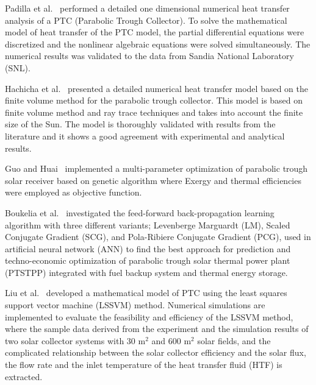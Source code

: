 Padilla et al.~\cite{Padilla2011} performed a detailed one dimensional numerical heat transfer analysis of a PTC (Parabolic Trough Collector). To solve the mathematical model of heat transfer of the PTC model, the partial differential equations were discretized and the nonlinear algebraic equations were solved simultaneously. The numerical results was validated to the data from Sandia National Laboratory (SNL).

Hachicha et al.~\cite{Hachicha2013} presented a detailed numerical heat transfer model based on the finite volume method for the parabolic trough collector.  This model is based on finite volume method and ray trace techniques and takes into account the finite size of the Sun.  The model is thoroughly validated with results from the literature and it shows a good agreement with experimental and analytical results.

Guo and Huai~\cite{JiangfengGuo2016-2} implemented a multi-parameter optimization of parabolic trough solar receiver based on genetic algorithm where Exergy and thermal efficiencies were employed as objective function.

Boukelia et al.~\cite{Boukelia2016} investigated the feed-forward back-propagation learning algorithm with three different variants; Levenberge Marguardt (LM), Scaled Conjugate Gradient (SCG), and Pola-Ribiere Conjugate Gradient (PCG), used in artificial neural network (ANN) to find the best approach for prediction and techno-economic optimization of parabolic trough solar thermal power plant (PTSTPP) integrated with fuel backup system and thermal energy storage.

Liu et al.~\cite{Liu2012} developed a mathematical model of PTC using the least squares support vector machine (LSSVM) method. Numerical simulations are implemented to evaluate the feasibility and efficiency of the LSSVM method, where the sample data derived from the experiment and the simulation results of two solar collector systems with 30 m$^2$ and 600 m$^2$ solar fields, and the complicated relationship between the solar collector efficiency and the solar flux, the flow rate and the inlet temperature of the heat transfer fluid (HTF) is extracted.

